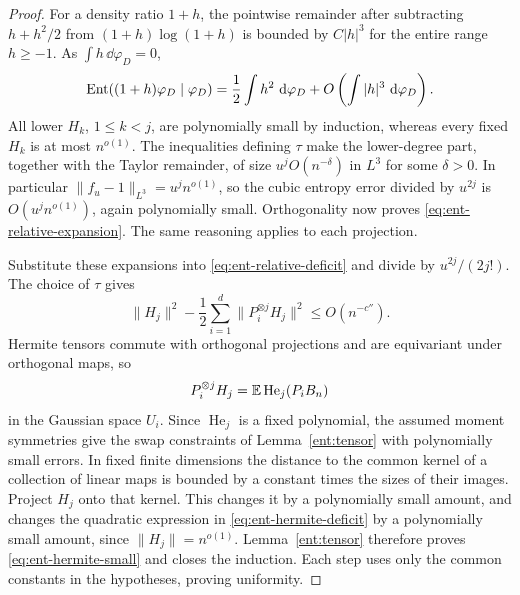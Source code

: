 \begin{proof}
For a density ratio \(1+h\), the pointwise remainder after
subtracting \(h+h^2/2\) from \((1+h)\log(1+h)\) is
bounded by \(C|h|^3\) for the entire range \(h\ge-1\).
As \(\int h\,\dd\varphi_D=0\),
\[
 \operatorname{Ent}((1+h)\varphi_D\mid\varphi_D)
 =\frac12\int h^2\,\,\mathrm d\varphi_D
       +O\left(\int|h|^3\,\,\mathrm d\varphi_D\right).
\]
All lower \(H_k\), \(1\le k<j\), are polynomially small by
induction, whereas every fixed \(H_k\) is at most \(n^{o(1)}\).
The inequalities defining \(\tau\) make the lower-degree part,
together with the Taylor remainder, of size
\(u^j O(n^{-\delta})\) in \(L^3\) for some \(\delta>0\).
In particular \(\|f_u-1\|_{L^3}=u^j n^{o(1)}\), so the cubic
entropy error divided by \(u^{2j}\) is
\(O(u^j n^{o(1)})\), again polynomially small. Orthogonality
now proves \eqref{eq:ent-relative-expansion}. The same reasoning
applies to each projection.

Substitute these expansions into \eqref{eq:ent-relative-deficit}
and divide by \(u^{2j}/(2j!)\). The choice of \(\tau\) gives
\begin{equation}\label{eq:ent-hermite-deficit}
 \|H_j\|^2-\frac12\sum_{i=1}^d
              \|P_i^{\otimes j}H_j\|^2
 \le O(n^{-c''}).
\end{equation}
Hermite tensors commute with orthogonal projections and are
equivariant under orthogonal maps, so
\[
 P_i^{\otimes j}H_j
 =\mathbb E\operatorname{He}_j(P_iB_n)
\]
in the Gaussian space \(U_i\). Since \(\operatorname{He}_j\) is a
fixed polynomial, the assumed moment symmetries give the swap
constraints of Lemma~\ref{ent:tensor} with polynomially small errors.
In fixed finite dimensions the distance to the common kernel of a
collection of linear maps is bounded by a constant times the sizes
of their images. Project \(H_j\) onto that kernel. This changes it
by a polynomially small amount, and changes the quadratic expression
in \eqref{eq:ent-hermite-deficit} by a polynomially small amount,
since \(\|H_j\|=n^{o(1)}\). Lemma~\ref{ent:tensor} therefore proves
\eqref{eq:ent-hermite-small} and closes the induction. Each step uses
only the common constants in the hypotheses, proving uniformity.
\end{proof}

